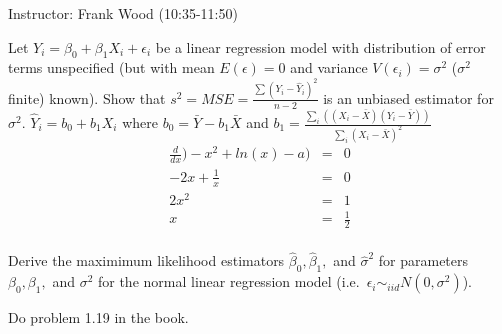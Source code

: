 \documentclass[12pt]{article}
\begin{document}
 \begin{center}
  Instructor: Frank Wood (10:35-11:50) 
 \end{center}
{}
\finishfirstpage



{
Let $Y_i = \beta_0 + \beta_1 X_i + \epsilon_i$ be a linear regression model with distribution of error terms unspecified (but with mean $E(\epsilon) = 0$ and variance $V(\epsilon_i) = \sigma^2$ ($\sigma^2$ finite) known).  Show that $s^2 = MSE = \frac{\sum(Y_i-\hat Y_i)^2}{n-2}$ is an unbiased estimator for $\sigma^2$.  $\hat Y_i = b_0 + b_1 X_i$ where $b_0 = \bar Y - b_1 \bar X$ and $b_1 = \frac{\sum_i((X_i-\bar X)(Y_i - \bar Y))}{\sum_i(X_i-\bar X)^2}$
}
{
\vfill
  \answer
}
{
\begin{eqnarray}
 \frac{d}{dx})-x^2 + ln(x) -a) &=& 0 \\
 -2x+\frac{1}{x} &=& 0 \\
  2x^2 &=& 1 \\
  x &=& \frac{1}{2} \\
\end{eqnarray}
}

{
Derive the maximimum likelihood estimators $\hat \beta_0, \hat \beta_1,$ and $\hat \sigma^2$ for parameters $\beta_0, \beta_1,$ and $\sigma^2$ for the normal linear regression model (i.e.~$\epsilon_i \sim_{iid} N(0,\sigma^2)$).
}
{
\vfill
  \answer
}
{
}

{
Do problem 1.19 in the book.
}
{
\vfill
  \answer
}
{
}



\problemsdone
\end{document}
